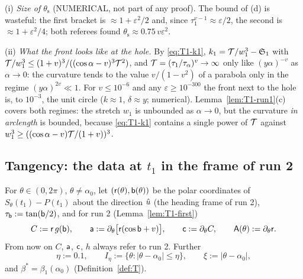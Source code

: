 \begin{remark}\label{rem:T1-hole}
(i) \emph{Size of $\theta_{\mathrm s}$} (NUMERICAL, not part of any proof). The bound of (d) is wasteful: the first bracket is
$\approx1+\varepsilon^2/2$ and, since $\tau_1^{v-1}\approx\varepsilon/2$, the second is $\approx1+\varepsilon^2/4$; both referees found
$\theta_{\mathrm s}\approx0.75\,v\varepsilon^2$.

(ii) \emph{What the front looks like at the hole.} By \eqref{eq:T1-k1}, $k_1=\mathcal T/w_1^3-\mathfrak S_1$ with
$\mathcal T/w_1^3\le(1+v)^3/((\cos\alpha-v)^3\mathcal T^2)$, and $\mathcal T=(\tau_1/\tau_\alpha)^v\to\infty$ only like $(y\alpha)^{-v}$ as $\alpha\to0$: the
curvature tends to the value $v/(1-v^2)$ of a parabola only in the regime $(y\alpha)^{2v}\ll1$. For $v\le10^{-6}$ and any
$\varepsilon\ge10^{-300}$ the front next to the hole is, to $10^{-3}$, the unit circle ($k\approx1$, $\delta\approx y$; numerical).
Lemma~\ref{lem:T1-run1}(c) covers both regimes: the stretch $w_1$ is unbounded as $\alpha\to0$, but the curvature \emph{in arclength}
is bounded, because \eqref{eq:T1-k1} contains a single power of $\mathcal T$ against $w_1^3\ge((\cos\alpha-v)\mathcal T/(1+v))^3$.
\end{remark}

\subsection{Tangency: the data at \texorpdfstring{$t_1$}{t1} in the frame of run 2}\label{sec:T1-tang}

For $\theta\in(0,2\pi)$, $\theta\ne\alpha_0$, let $(\mathsf r(\theta),\mathsf b(\theta))$ be the polar coordinates of $S_\theta(t_1)-P(t_1)$
about the direction $\hat u$ (the heading frame of run 2), $\tau_{\mathsf b}:=\tan(\mathsf b/2)$, and for run 2 (Lemma~\ref{lem:T1-first})
\[
C:=\mathsf r\,g(\mathsf b),\qquad\mathsf a:=\partial_\theta\bigl[\mathsf r(\cos\mathsf b+v)\bigr],\qquad\mathsf c:=\partial_\theta C,\qquad\mathsf A(\theta):=\partial_\theta\mathsf r .
\]
From now on $C$, $\mathsf a$, $\mathsf c$, $h$ always refer to run 2. Further
\[
\eta:=0.1,\qquad I_\eta:=\{\theta:|\theta-\alpha_0|\le\eta\},\qquad\xi:=|\theta-\alpha_0| ,
\]
and $\beta^*=\beta_1(\alpha_0)$ (Definition~\ref{def:T}).


